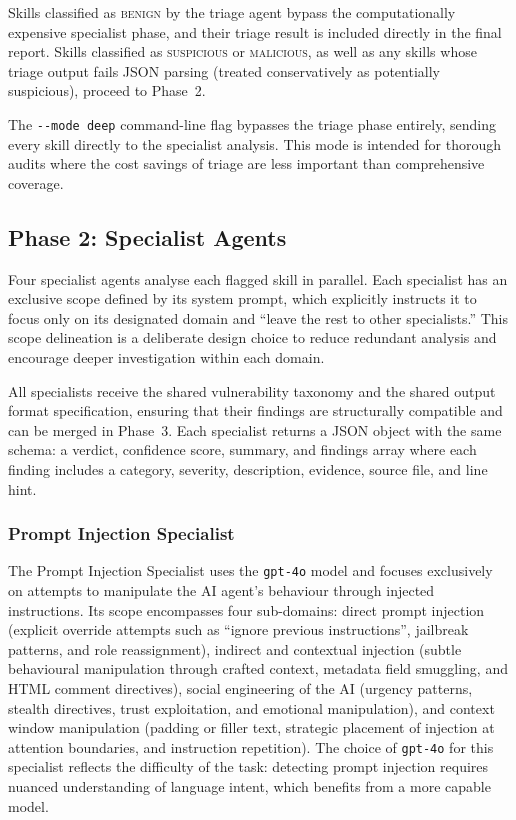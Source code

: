 Skills classified as \textsc{benign} by the triage agent bypass the computationally expensive specialist phase, and their triage result is included directly in the final report. Skills classified as \textsc{suspicious} or \textsc{malicious}, as well as any skills whose triage output fails JSON parsing (treated conservatively as potentially suspicious), proceed to Phase~2.

The \texttt{-{}-mode deep} command-line flag bypasses the triage phase entirely, sending every skill directly to the specialist analysis. This mode is intended for thorough audits where the cost savings of triage are less important than comprehensive coverage.

\subsection{Phase 2: Specialist Agents}
\label{sec:specialists}

Four specialist agents analyse each flagged skill in parallel. Each specialist has an exclusive scope defined by its system prompt, which explicitly instructs it to focus only on its designated domain and ``leave the rest to other specialists.'' This scope delineation is a deliberate design choice to reduce redundant analysis and encourage deeper investigation within each domain.

All specialists receive the shared vulnerability taxonomy and the shared output format specification, ensuring that their findings are structurally compatible and can be merged in Phase~3. Each specialist returns a JSON object with the same schema: a verdict, confidence score, summary, and findings array where each finding includes a category, severity, description, evidence, source file, and line hint.

\subsubsection{Prompt Injection Specialist}

The Prompt Injection Specialist uses the \texttt{gpt-4o} model and focuses exclusively on attempts to manipulate the AI agent's behaviour through injected instructions. Its scope encompasses four sub-domains: direct prompt injection (explicit override attempts such as ``ignore previous instructions'', jailbreak patterns, and role reassignment), indirect and contextual injection (subtle behavioural manipulation through crafted context, metadata field smuggling, and HTML comment directives), social engineering of the AI (urgency patterns, stealth directives, trust exploitation, and emotional manipulation), and context window manipulation (padding or filler text, strategic placement of injection at attention boundaries, and instruction repetition). The choice of \texttt{gpt-4o} for this specialist reflects the difficulty of the task: detecting prompt injection requires nuanced understanding of language intent, which benefits from a more capable model.

